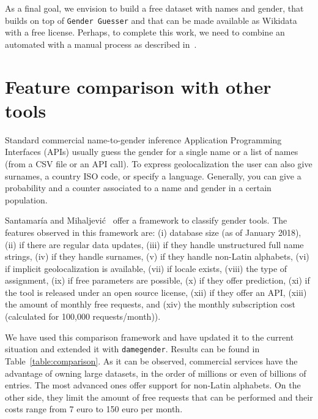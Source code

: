\documentclass[a4paper]{article}
\begin{document}

As a final goal, we envision to build a free dataset with names and gender, that builds on top of \texttt{Gender Guesser} and that can be made available as Wikidata with a free license. 
Perhaps, to complete this work, we need to combine an automated with a manual process as described in~\cite{10.7717/peerj-cs.156}.



\section{Feature comparison with other tools}
\label{sec:comparison}

Standard commercial name-to-gender inference Application Programming Interfaces (APIs) usually guess the gender for a single name or a list of names (from a CSV file or an API call). 
To express geolocalization the user can also give surnames, a country ISO code, or specify a language.
Generally, you can give a probability and a counter associated to a name and gender in a certain population.

Santamaría and Mihaljevi\'c~\cite{10.7717/peerj-cs.156} offer a framework to classify gender tools.
The features observed in this framework are: (i) database size (as of January 2018), (ii) if there are regular data updates, (iii) if they handle unstructured full name strings, (iv) if they handle surnames, (v) if they handle non-Latin alphabets, (vi) if implicit geolocalization is available, (vii) if locale exists, (viii) the type of assignment, (ix) if free parameters are possible, (x) if they offer prediction, (xi) if the tool is released under an open source license, (xii) if they offer an API, (xiii) the amount of monthly free requests, and (xiv) the monthly subscription cost (calculated for 100,000 requests/month)).

We have used this comparison framework and have updated it to the current situation and extended it with \texttt{damegender}.
Results can be found in Table~\ref{table:comparison}.
As it can be observed, commercial services have the advantage of owning large datasets, in the order of millions or even of billions of entries.
The most advanced ones offer support for non-Latin alphabets.
On the other side, they limit the amount of free requests that can be performed and their costs range from 7 euro to 150 euro per month.
\end{document}

